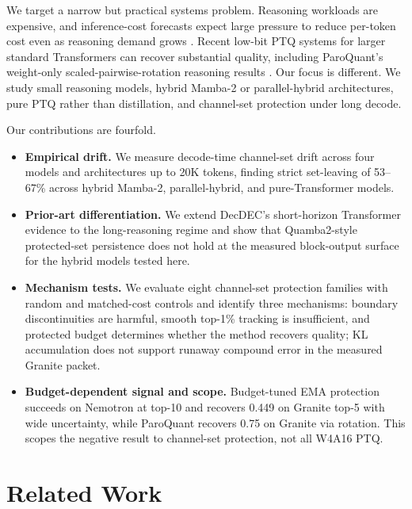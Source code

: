 \documentclass{article}
\begin{document}
We target a narrow but practical systems problem. Reasoning workloads are expensive, and inference-cost forecasts expect large pressure to reduce per-token cost even as reasoning demand grows \citep{wiggers2025reasoningcosts,gartner2026inferencecost}. Recent low-bit PTQ systems for larger standard Transformers can recover substantial quality, including ParoQuant's weight-only scaled-pairwise-rotation reasoning results \citep{liang2026paroquant}. Our focus is different. We study small reasoning models, hybrid Mamba-2 or parallel-hybrid architectures, pure PTQ rather than distillation, and channel-set protection under long decode.

Our contributions are fourfold.
\begin{itemize}
\item \textbf{Empirical drift.} We measure decode-time channel-set drift across four models and architectures up to 20K tokens, finding strict set-leaving of 53--67\% across hybrid Mamba-2, parallel-hybrid, and pure-Transformer models.
\item \textbf{Prior-art differentiation.} We extend DecDEC's short-horizon Transformer evidence to the long-reasoning regime and show that Quamba2-style protected-set persistence does not hold at the measured block-output surface for the hybrid models tested here.
\item \textbf{Mechanism tests.} We evaluate eight channel-set protection families with random and matched-cost controls and identify three mechanisms: boundary discontinuities are harmful, smooth top-1\% tracking is insufficient, and protected budget determines whether the method recovers quality; KL accumulation does not support runaway compound error in the measured Granite packet.
\item \textbf{Budget-dependent signal and scope.} Budget-tuned EMA protection succeeds on Nemotron at top-10 and recovers 0.449 on Granite top-5 with wide uncertainty, while ParoQuant recovers 0.75 on Granite via rotation. This scopes the negative result to channel-set protection, not all W4A16 PTQ.
\end{itemize}

\section{Related Work}
\end{document}
